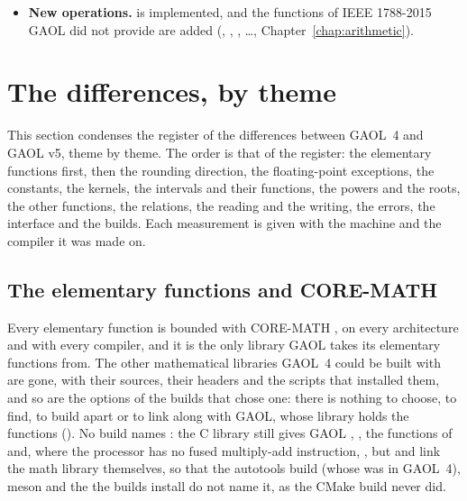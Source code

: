 \documentclass[12pt,a4paper,twoside,openright]{book}
\begin{document}
\begin{itemize}
  stops the reading. The reader knows every function of GAOL, and
   reads the names of IEEE 1788-2015
  (, \ldots). The format  writes interval
  literals, which are read back bit for bit; the decimal formats round the
  bounds outward whatever the C library, and the format  keeps
  the digits of each bound (Chapter~\ref{chap:io}).
\item[$\bullet$] \textbf{New operations.}  is implemented, and
  the functions of IEEE 1788-2015 GAOL did not provide are added
  (, , , \ldots,
  Chapter~\ref{chap:arithmetic}).
\end{itemize}

\section{The differences, by theme}\label{sec:migration-themes}
%

This section condenses the register of the differences between GAOL~4 and
GAOL v5, theme by theme. The order is that of the register: the elementary
functions first, then the rounding direction, the floating-point exceptions,
the constants, the kernels, the intervals and their functions, the powers and
the roots, the other functions, the relations, the reading and the writing,
the errors, the interface and the builds. Each measurement is given with the
machine and the compiler it was made on.

\subsection{The elementary functions and CORE-MATH}
\label{sec:changes-core-math}
%

Every elementary function is bounded with CORE-MATH \cite{CoreMath:2022}, on
every architecture and with every compiler, and it is the only library GAOL
takes its elementary functions from.\newinvfive{} The other mathematical
libraries GAOL~4 could be built with are gone, with their sources, their
headers and the scripts that installed them, and so are the options of the
builds that chose one: there is nothing to choose, to find, to build apart or
to link along with GAOL, whose library holds the functions
(). No build names : the C library
still gives GAOL , , the functions of
 and, where the processor has no fused multiply-add
instruction, , but  and  link the math
library themselves, so that the autotools build (whose  was
 in GAOL~4), meson and the  the builds install do
not name it, as the CMake build never did.
\end{document}
